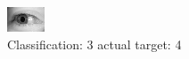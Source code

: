 \begin{figure}[h!]
\begin{center}
\includegraphics[width=0.60\columnwidth]{figures/ID3131_class_3_target_4.png}
\end{center}
\caption{ Classification: 3 actual target: 4}
\label{fig:ID3131_class_3_target_4}
\end{figure}
